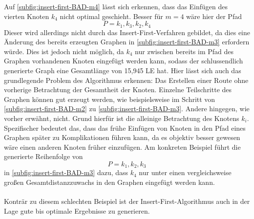 Auf \vref{subfig:insert-first-BAD-m4} lässt sich erkennen, dass das Einfügen des vierten Knoten $k_4$ nicht optimal geschieht. 
Besser für $m = 4$ wäre hier der Pfad 
    $$P=k_1, k_3, k_2, k_4$$
Dieser wird allerdings nicht durch das Insert-First-Verfahren gebildet, da dies eine Änderung des bereits erzeugten Graphen in \vref{subfig:insert-first-BAD-m3} erfordern würde. 
Dies ist jedoch nicht möglich, da $k_4$ nur zwischen bereits im Pfad des Graphen vorhandenen Knoten eingefügt werden kann, sodass der schlussendlich generierte Graph eine Gesamtlänge von 15,945 \ac{LE} hat.
Hier lässt sich auch das grundlegende Problem des Algorithmus erkennen: Das Erstellen einer Route ohne vorherige Betrachtung der Gesamtheit der Knoten. 
Einzelne Teilschritte des Graphen können gut erzeugt werden, wie beispielsweise im Schritt von \vref{subfig:insert-first-BAD-m2} zu \vref{subfig:insert-first-BAD-m3}. 
Andere hingegen, wie vorher erwähnt, nicht. 
Grund hierfür ist die alleinige Betrachtung des Knotens $k_i$. 
Spezifischer bedeutet das, dass das frühe Einfügen von Knoten in den Pfad eines Graphen später zu Komplikationen führen kann, da es objektiv besser gewesen wäre einen anderen Knoten früher einzufügen.
Am konkreten Beispiel führt die generierte Reihenfolge von 
    $$P=k_1, k_2, k_3$$
in \vref{subfig:insert-first-BAD-m3} dazu, dass $k_4$ nur unter einen vergleichsweise großen Gesamtdistanzzuwachs in den Graphen eingefügt werden kann. 
\\\\
Konträr zu diesem schlechten Beispiel ist der Insert-First-Algorithmus auch in der Lage gute bis optimale Ergebnisse zu generieren. 

